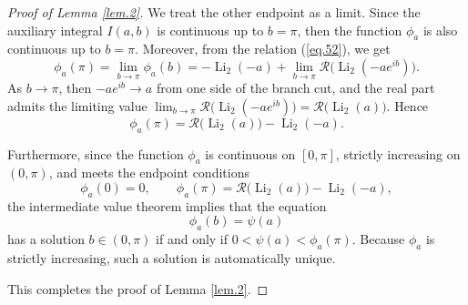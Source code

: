 \documentclass[preprint,12pt,nopreprintline]{elsarticle}
\begin{document}
\begin{proof}[Proof of Lemma \ref{lem.2}]
We treat the other endpoint as a limit. Since the auxiliary integral \(I(a,b)\) is continuous up to \(b=\pi\), then the function \(\phi_a\) is also continuous up to \(b=\pi\). Moreover, from the relation (\ref{eq.52}), we get
\begin{equation}
\phi_a(\pi)
=
\lim_{b\longrightarrow\pi}\phi_a(b)
=
-\operatorname{Li}_2(-a)+\lim_{b\longrightarrow\pi}\mathscr{R}\!\bigl(\operatorname{Li}_2(-ae^{ib})\bigr).
\end{equation}
As \(b\longrightarrow\pi\), then \(-ae^{ib}\to a\) from one side of the branch cut, and the real part admits the limiting value \(\lim_{b\rightarrow\pi}\mathscr{R}\!\bigl(\operatorname{Li}_2(-ae^{ib})\bigr)=\mathscr{R}\!\bigl(\operatorname{Li}_2(a)\bigr)\). Hence
\begin{equation}
\phi_a(\pi)=\mathscr{R}\!\bigl(\operatorname{Li}_2(a)\bigr)-\operatorname{Li}_2(-a).
\end{equation}

Furthermore, since the function \(\phi_a\) is continuous on \([0,\pi]\), strictly increasing on \((0,\pi)\), and meets the endpoint conditions
\begin{equation}
\phi_a(0)=0,
\qquad
\phi_a(\pi)=\mathscr{R}\!\bigl(\operatorname{Li}_2(a)\bigr)-\operatorname{Li}_2(-a),
\end{equation}
the intermediate value theorem implies that the equation
\begin{equation}
\phi_a(b)=\psi(a)
\end{equation}
has a solution \(b\in(0,\pi)\) if and only if \(0<\psi(a)<\phi_a(\pi)\). Because \(\phi_a\) is strictly increasing, such a solution is automatically unique. 

This completes the proof of Lemma \ref{lem.2}. 
\end{proof}
\end{document}
